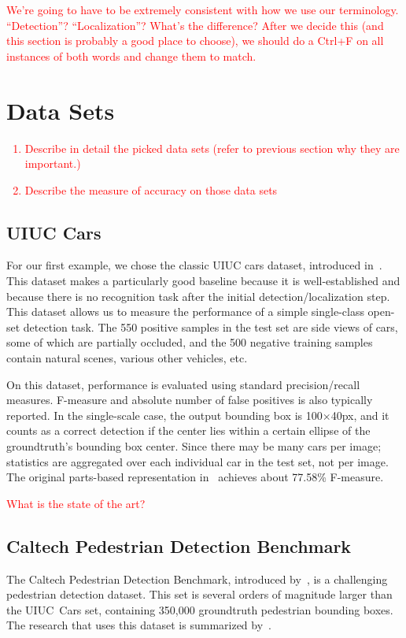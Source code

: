 \documentclass[10pt,twocolumn,letterpaper]{article}
\newcommand{\preliminary}[1]{\textcolor{red}{#1}}
\newcommand{\todo}{\colorbox{yellow}{\fbox{\LARGE{TODO}}}}
\begin{document}
\preliminary{
\todo We're going to have to be extremely consistent with how we use our terminology. ``Detection''? ``Localization''? What's the difference? After we decide this (and this section is probably a good place to choose), we should do a Ctrl+F on all instances of both words and change them to match.
}


\section{Data Sets}
\preliminary{
\begin{enumerate}
\item Describe in detail the picked data sets (refer to previous section why they are important.)
\item Describe the measure of accuracy on those data sets
\end{enumerate}
}

\subsection{UIUC Cars}\label{sec:uiuc-cars}
For our first example, we chose the classic UIUC cars dataset, introduced in~\cite{agarwal2002learning,agarwal2004learning}. This dataset makes a particularly good baseline because it is well-established and because there is no recognition task after the initial detection/localization step. This dataset allows us to measure the performance of a simple single-class open-set detection task. The 550 positive samples in the test set are side views of cars, some of which are partially occluded, and the 500 negative training samples contain natural scenes, various other vehicles, etc.

On this dataset, performance is evaluated using standard precision/recall measures. F-measure and absolute number of false positives is also typically reported. In the single-scale case, the output bounding box is 100$\times$40px, and it counts as a correct detection if the center lies within a certain ellipse of the groundtruth's bounding box center. Since there may be many cars per image; statistics are aggregated over each individual car in the test set, not per image. The original parts-based representation in~\cite{agarwal2002learning} achieves about 77.58\% F-measure.

\preliminary{\todo What is the state of the art?}

\subsection{Caltech Pedestrian Detection Benchmark}
The Caltech Pedestrian Detection Benchmark, introduced by~\cite{dollarCVPR09peds}, is a challenging pedestrian detection dataset. This set is several orders of magnitude larger than the UIUC~Cars set, containing 350,000 groundtruth pedestrian bounding boxes. The research that uses this dataset is summarized by~\cite{Dollar2012PAMI}.
\end{document}

